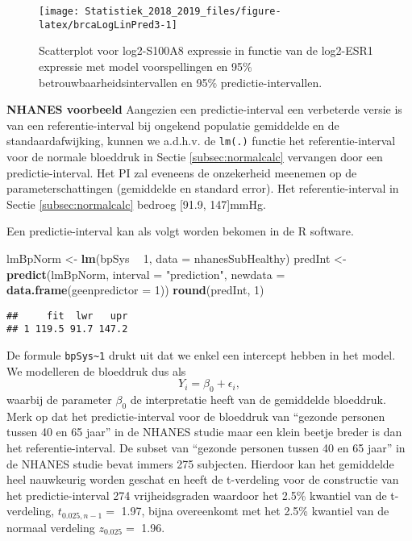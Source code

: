 \documentclass[12pt,dutch,coursenotes]{book}
\newenvironment{Shaded}{\begin{snugshade}}{\end{snugshade}}
\newcommand{\KeywordTok}[1]{\textcolor[rgb]{0.13,0.29,0.53}{\textbf{#1}}}
\newcommand{\DataTypeTok}[1]{\textcolor[rgb]{0.13,0.29,0.53}{#1}}
\newcommand{\DecValTok}[1]{\textcolor[rgb]{0.00,0.00,0.81}{#1}}
\newcommand{\StringTok}[1]{\textcolor[rgb]{0.31,0.60,0.02}{#1}}
\newcommand{\OperatorTok}[1]{\textcolor[rgb]{0.81,0.36,0.00}{\textbf{#1}}}
\newcommand{\NormalTok}[1]{#1}
\theoremstyle{definition}
\theoremstyle{definition}
\theoremstyle{definition}
\theoremstyle{remark}
\begin{document}
\begin{figure}

{\centering \texttt{[image: Statistiek\_2018\_2019\_files/figure-latex/brcaLogLinPred3-1]} 

}

\caption{Scatterplot voor log2-S100A8 expressie in functie van de log2-ESR1 expressie met model voorspellingen en 95$\%$ betrouwbaarheidsintervallen en 95$\%$ predictie-intervallen.}\label{fig:brcaLogLinPred3}
\end{figure}

\textbf{NHANES voorbeeld} Aangezien een predictie-interval een
verbeterde versie is van een referentie-interval bij ongekend populatie
gemiddelde en de standaardafwijking, kunnen we a.d.h.v. de
\texttt{lm(.)} functie het referentie-interval voor de normale bloeddruk
in Sectie \ref{subsec:normalcalc} vervangen door een predictie-interval.
Het PI zal eveneens de onzekerheid meenemen op de parameterschattingen
(gemiddelde en standard error). Het referentie-interval in Sectie
\ref{subsec:normalcalc} bedroeg {[}91.9, 147{]}mmHg.

Een predictie-interval kan als volgt worden bekomen in de R software.

\begin{Shaded}
\begin{Highlighting}[]
\NormalTok{lmBpNorm <-}\StringTok{ }\KeywordTok{lm}\NormalTok{(bpSys }\OperatorTok{~}\StringTok{ }\DecValTok{1}\NormalTok{, }\DataTypeTok{data =}\NormalTok{ nhanesSubHealthy)}
\NormalTok{predInt <-}\StringTok{ }\KeywordTok{predict}\NormalTok{(lmBpNorm, }\DataTypeTok{interval =} \StringTok{"prediction"}\NormalTok{, }
    \DataTypeTok{newdata =} \KeywordTok{data.frame}\NormalTok{(}\DataTypeTok{geenpredictor =} \DecValTok{1}\NormalTok{))}
\KeywordTok{round}\NormalTok{(predInt, }\DecValTok{1}\NormalTok{)}
\end{Highlighting}
\end{Shaded}

\begin{verbatim}
##     fit  lwr   upr
## 1 119.5 91.7 147.2
\end{verbatim}

De formule \texttt{bpSys\textasciitilde{}1} drukt uit dat we enkel een
intercept hebben in het model. We modelleren de bloeddruk dus als
\[Y_i=\beta_0 + \epsilon_i,\] waarbij de parameter \(\beta_0\) de
interpretatie heeft van de gemiddelde bloeddruk. Merk op dat het
predictie-interval voor de bloeddruk van ``gezonde personen tussen 40 en
65 jaar'' in de NHANES studie maar een klein beetje breder is dan het
referentie-interval. De subset van ``gezonde personen tussen 40 en 65
jaar'' in de NHANES studie bevat immers 275 subjecten. Hierdoor kan het
gemiddelde heel nauwkeurig worden geschat en heeft de t-verdeling voor
de constructie van het predictie-interval 274 vrijheidsgraden waardoor
het 2.5\% kwantiel van de t-verdeling, \(t_{0.025,n-1}=\) 1.97, bijna
overeenkomt met het 2.5\% kwantiel van de normaal verdeling
\(z_{0.025}=\) 1.96.
\end{document}
